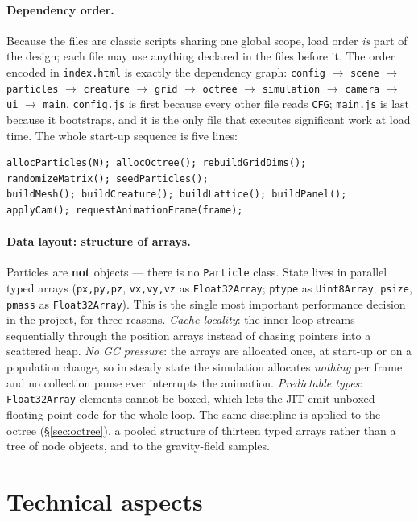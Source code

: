 \documentclass[10pt,a4paper]{article}
\newcommand{\code}[1]{\texttt{\small #1}}
\newcommand{\file}[1]{\texttt{\small\color{accent!70!black}#1}}
\begin{document}
\paragraph{Dependency order.} Because the files are classic scripts sharing one global scope, load order
\emph{is} part of the design; each file may use anything declared in the files before it. The order encoded
in \file{index.html} is exactly the dependency graph:
\code{config} $\to$ \code{scene} $\to$ \code{particles} $\to$ \code{creature} $\to$ \code{grid} $\to$
\code{octree} $\to$ \code{simulation} $\to$ \code{camera} $\to$ \code{ui} $\to$ \code{main}.
\file{config.js} is first because every other file reads \code{CFG}; \file{main.js} is last because it
bootstraps, and it is the only file that executes significant work at load time. The whole start-up
sequence is five lines:

\begin{lstlisting}
allocParticles(N); allocOctree(); rebuildGridDims(); randomizeMatrix(); seedParticles();
buildMesh(); buildCreature(); buildLattice(); buildPanel(); applyCam(); requestAnimationFrame(frame);
\end{lstlisting}

\paragraph{Data layout: structure of arrays.} Particles are \textbf{not} objects --- there is no
\code{Particle} class. State lives in parallel typed arrays (\code{px,py,pz}, \code{vx,vy,vz} as
\code{Float32Array}; \code{ptype} as \code{Uint8Array}; \code{psize}, \code{pmass} as \code{Float32Array}).
This is the single most important performance decision in the project, for three reasons. \emph{Cache
locality}: the inner loop streams sequentially through the position arrays instead of chasing pointers into
a scattered heap. \emph{No GC pressure}: the arrays are allocated once, at start-up or on a population
change, so in steady state the simulation allocates \emph{nothing} per frame and no collection pause ever
interrupts the animation. \emph{Predictable types}: \code{Float32Array} elements cannot be boxed, which
lets the JIT emit unboxed floating-point code for the whole loop. The same discipline is applied to the
octree (\S\ref{sec:octree}), a pooled structure of thirteen typed arrays rather than a tree of node
objects, and to the gravity-field samples.

\section{Technical aspects}
\label{sec:technical}
\end{document}
